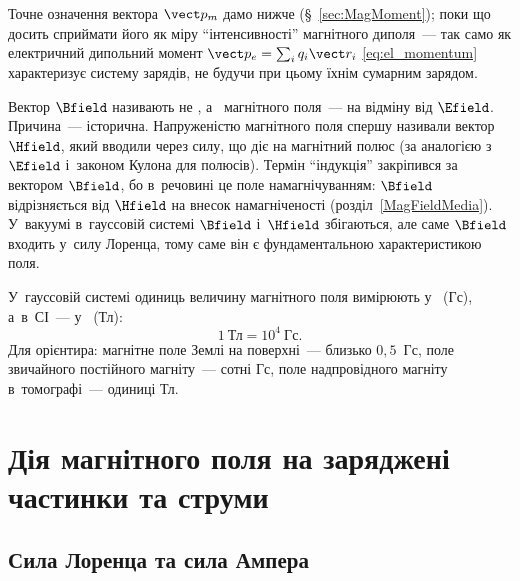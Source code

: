 Точне означення вектора $\vect p_m$ дамо нижче (\S~\ref{sec:MagMoment}); поки що досить
сприймати його як міру \enquote{інтенсивності} магнітного диполя~--- так само як
електричний дипольний момент $\vect p_e=\sum_i q_i\vect r_i$ \eqref{eq:el_momentum}
характеризує систему зарядів, не будучи при цьому їхнім сумарним зарядом.

\begin{Historical}[unbreakable]
	Вектор $\Bfield$ називають не , а~ магнітного
	поля~--- на відміну від $\Efield$. Причина~--- історична. Напруженістю магнітного поля
	спершу називали вектор $\Hfield$, який вводили через силу, що діє на магнітний полюс
	(за аналогією з~$\Efield$ і~законом Кулона для полюсів). Термін \enquote{індукція}
	закріпився за вектором $\Bfield$, бо в~речовині це поле 
	намагнічуванням: $\Bfield$ відрізняється від $\Hfield$ на внесок намагніченості
	(розділ~\ref{MagFieldMedia}). У~вакуумі в~гауссовій системі $\Bfield$ і~$\Hfield$
	збігаються, але саме $\Bfield$ входить у~силу Лоренца, тому саме він є фундаментальною
	характеристикою поля.
\end{Historical}

У~гауссовій системі одиниць величину магнітного поля вимірюють у~ (Гс),
а~в~СІ~--- у~ (Тл):
\begin{equation*}
	1\ \text{Тл} = 10^4\ \text{Гс}.
\end{equation*}
Для орієнтира: магнітне поле Землі на поверхні~--- близько $0{,}5$~Гс, поле звичайного
постійного магніту~--- сотні Гс, поле надпровідного магніту в~томографі~--- одиниці Тл.


\section{Дія магнітного поля на заряджені частинки та струми} \hypertarget{magnetic-force-on-charges-currents}{}


\subsection*{Сила Лоренца та сила Ампера}


